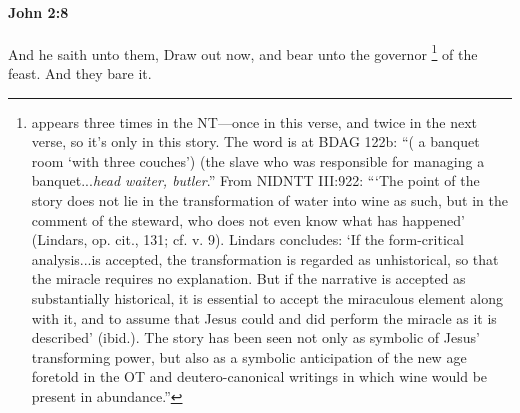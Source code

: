 		\paragraph{John 2:8} %
			\label{JOHN-2-8}

			And he saith unto them, Draw out now, and bear unto the governor%
				\footnote{%
					 appears three times in the NT---once in this verse, and twice in the next verse, so it's only in this story. The word is at BDAG 122b: ``( a banquet room `with three couches') (the slave who was responsible for managing a banquet...\textit{head waiter, butler}.'' From NIDNTT III:922: ```The point of the story does not lie in the transformation of water into wine as such, but in the comment of the steward, who does not even know what has happened' (Lindars, op. cit., 131; cf. v. 9). Lindars concludes: `If the form-critical analysis...is accepted, the transformation is regarded as unhistorical, so that the miracle requires no explanation. But if the narrative is accepted as substantially historical, it is essential to accept the miraculous element along with it, and to assume that Jesus could and did perform the miracle as it is described' (ibid.). The story has been seen not only as symbolic of Jesus' transforming power, but also as a symbolic anticipation of the new age foretold in the OT and deutero-canonical writings in which wine would be present in abundance.''
					}
			of the feast. And they bare it.

			\begin{framed}
			\scriptsize
				\begin{compactdesc}
					\item[SBLG] 
				\end{compactdesc}
			\end{framed}

